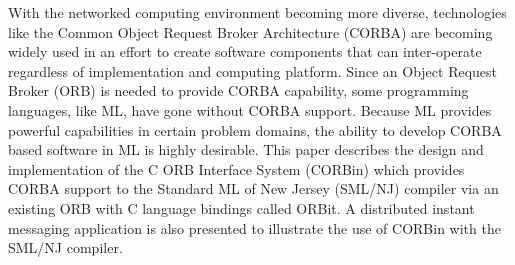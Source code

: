 

With the networked computing environment becoming more diverse, 
technologies like the Common Object Request Broker Architecture (CORBA) 
are becoming widely used in an effort to create software components 
that can inter-operate regardless of implementation and computing 
platform.  Since an Object Request Broker (ORB) is needed
to provide CORBA capability, some programming languages, like ML, 
have gone without CORBA support. 
Because ML provides powerful capabilities in certain problem domains,  
the ability to develop CORBA based software in ML is highly desirable.  
This paper describes the design and implementation of the C ORB Interface
System (CORBin) which provides CORBA support to the Standard ML of New Jersey 
(SML/NJ) compiler via an existing ORB with C language bindings called ORBit.  
A distributed instant messaging application is also presented to 
illustrate the use of CORBin with the SML/NJ compiler. 

